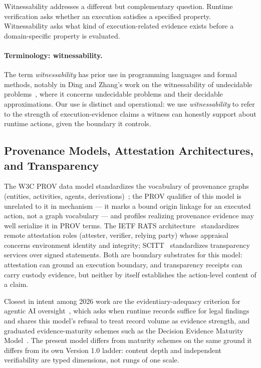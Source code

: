 \documentclass[11pt]{article}
\begin{document}
Witnessability addresses a different but complementary question. Runtime verification asks whether an execution satisfies a specified property. Witnessability asks what kind of execution-related evidence exists before a domain-specific property is evaluated.

\paragraph{Terminology: witnessability.} The term \emph{witnessability} has prior use in programming languages and formal methods, notably in Ding and Zhang's work on the witnessability of undecidable problems~\cite{DingZhang2023}, where it concerns undecidable problems and their decidable approximations. Our use is distinct and operational: we use \emph{witnessability} to refer to the strength of execution-evidence claims a witness can honestly support about runtime actions, given the boundary it controls.

\subsection{Provenance Models, Attestation Architectures, and Transparency}
The W3C PROV data model standardizes the vocabulary of provenance graphs (entities, activities, agents, derivations)~\cite{w3c_prov}; the PROV qualifier of this model is unrelated to it in mechanism --- it marks a bound origin linkage for an executed action, not a graph vocabulary --- and profiles realizing provenance evidence may well serialize it in PROV terms. The IETF RATS architecture~\cite{rfc9334_rats} standardizes remote attestation roles (attester, verifier, relying party) whose appraisal concerns environment identity and integrity; SCITT~\cite{rfc9943_scitt} standardizes transparency services over signed statements. Both are boundary substrates for this model: attestation can ground an execution boundary, and transparency receipts can carry custody evidence, but neither by itself establishes the action-level content of a claim.

Closest in intent among 2026 work are the evidentiary-adequacy criterion for agentic AI oversight~\cite{evidentiary_adequacy_2026}, which asks when runtime records suffice for legal findings and shares this model's refusal to treat record volume as evidence strength, and graduated evidence-maturity schemes such as the Decision Evidence Maturity Model~\cite{demm_2026}. The present model differs from maturity schemes on the same ground it differs from its own Version 1.0 ladder: content depth and independent verifiability are typed dimensions, not rungs of one scale.
\end{document}
